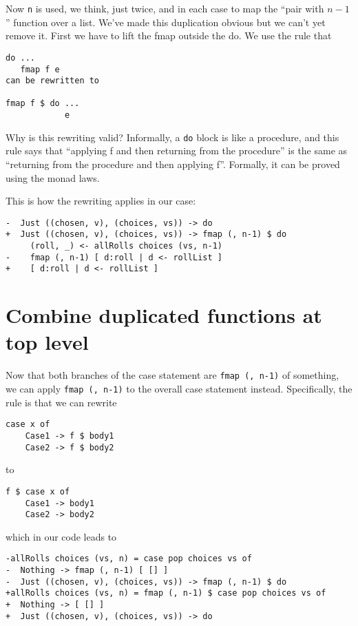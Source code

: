 Now \texttt{n} is used, we think, just twice, and in each case to map the ``pair with $n-1$'' function over a list. We've made this duplication obvious but we can't yet remove it. First we have to lift the fmap outside the do. We use the rule that

\begin{verbatim}
do ...
   fmap f e
can be rewritten to

fmap f $ do ...
            e
\end{verbatim}
Why is this rewriting valid? Informally, a \texttt{do} block is like a procedure, and this rule says that ``applying f and then returning from the procedure'' is the same as ``returning from the procedure and then applying f''. Formally, it can be proved using the monad laws.

This is how the rewriting applies in our case:

\begin{verbatim}
-  Just ((chosen, v), (choices, vs)) -> do
+  Just ((chosen, v), (choices, vs)) -> fmap (, n-1) $ do
     (roll, _) <- allRolls choices (vs, n-1)
-    fmap (, n-1) [ d:roll | d <- rollList ]
+    [ d:roll | d <- rollList ]
\end{verbatim}

\section{Combine duplicated functions at top level}


Now that both branches of the case statement are \texttt{fmap (, n-1)} of something, we can apply \texttt{fmap (, n-1)} to the overall case statement instead. Specifically, the rule is that we can rewrite

\begin{verbatim}
case x of
    Case1 -> f $ body1
    Case2 -> f $ body2
\end{verbatim}
to

\begin{verbatim}
f $ case x of
    Case1 -> body1
    Case2 -> body2
\end{verbatim}
which in our code leads to

\begin{verbatim}
-allRolls choices (vs, n) = case pop choices vs of
-  Nothing -> fmap (, n-1) [ [] ]
-  Just ((chosen, v), (choices, vs)) -> fmap (, n-1) $ do
+allRolls choices (vs, n) = fmap (, n-1) $ case pop choices vs of
+  Nothing -> [ [] ]
+  Just ((chosen, v), (choices, vs)) -> do
\end{verbatim}


